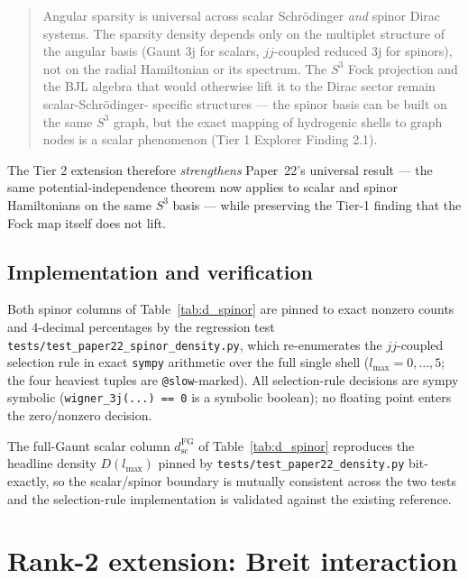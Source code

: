 \documentclass[twocolumn,pra,amsmath,amssymb,superscriptaddress]{revtex4-2}
\begin{document}
\begin{quote}
Angular sparsity is universal across scalar Schr\"odinger \emph{and}
spinor Dirac systems. The sparsity density depends only on the
multiplet structure of the angular basis (Gaunt 3j for scalars,
$jj$-coupled reduced 3j for spinors), not on the radial Hamiltonian
or its spectrum. The $S^3$ Fock projection and the BJL algebra that
would otherwise lift it to the Dirac sector remain scalar-Schr\"odinger-
specific structures --- the spinor basis can be built on the same
$S^3$ graph, but the exact mapping of hydrogenic shells to graph
nodes is a scalar phenomenon (Tier 1 Explorer Finding 2.1).
\end{quote}

The Tier 2 extension therefore \emph{strengthens} Paper~22's universal
result --- the same potential-independence theorem now applies to
scalar and spinor Hamiltonians on the same $S^3$ basis --- while
preserving the Tier-1 finding that the Fock map itself does not lift.

\subsection{Implementation and verification}

Both spinor columns of Table~\ref{tab:d_spinor} are pinned to exact
nonzero counts and 4-decimal percentages by the regression test
\texttt{tests/test\_paper22\_spinor\_density.py}, which re-enumerates
the $jj$-coupled selection rule in exact \texttt{sympy} arithmetic over
the full single shell ($l_{\max}=0,\dots,5$; the four heaviest tuples
are \texttt{@slow}-marked). All selection-rule decisions are sympy
symbolic (\texttt{wigner\_3j(...) == 0} is a symbolic boolean); no
floating point enters the zero/nonzero decision. 

The full-Gaunt scalar column $d_{\mathrm{sc}}^{\mathrm{FG}}$ of
Table~\ref{tab:d_spinor} reproduces the headline density $D(l_{\max})$
pinned by \texttt{tests/test\_paper22\_density.py} bit-exactly, so the
scalar/spinor boundary is mutually consistent across the two tests and
the selection-rule implementation is validated against the existing
reference.

\section{Rank-2 extension: Breit interaction}
\label{sec:paper22_breit}
\end{document}

